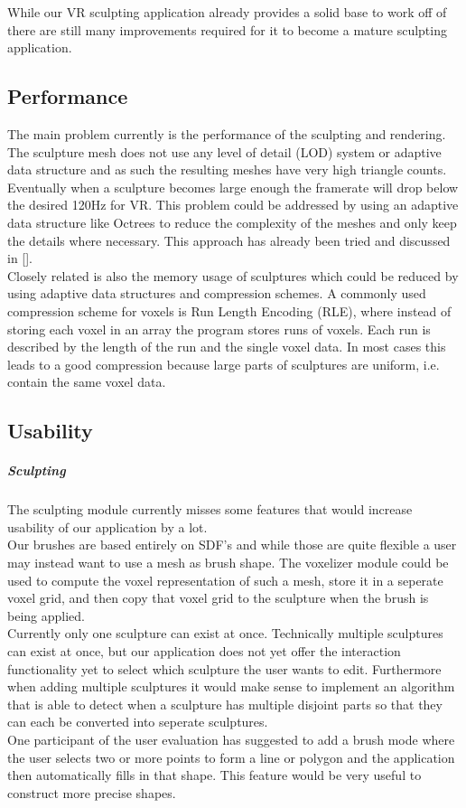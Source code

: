 While our VR sculpting application already provides a solid base to work off of there are still many improvements required for it to become a mature sculpting application.

\subsection{Performance}
The main problem currently is the performance of the sculpting and rendering. The sculpture mesh does not use any level of detail (LOD) system or adaptive data structure and as such the resulting meshes have very high triangle counts.
Eventually when a sculpture becomes large enough the framerate will drop below the desired 120Hz for VR. This problem could be addressed by using an adaptive data structure like Octrees to reduce the complexity of the meshes and only keep the details where necessary. This approach has already been tried and discussed in [].\\
Closely related is also the memory usage of sculptures which could be reduced by using adaptive data structures and compression schemes. A commonly used compression scheme for voxels is Run Length Encoding (RLE), where instead of storing
each voxel in an array the program stores runs of voxels. Each run is described by the length of the run and the single voxel data. In most cases this leads to a good compression because large parts of sculptures are uniform, i.e. contain the same voxel data.

\subsection{Usability}

\subparagraph{Sculpting}
The sculpting module currently misses some features that would increase usability of our application by a lot.\\
Our brushes are based entirely on SDF's and while those are quite flexible a user may instead want to use a mesh as brush shape. The voxelizer module could be used to compute the voxel representation of such a mesh, store it in a seperate voxel grid, and then copy that voxel grid to the sculpture when the brush is being applied.\\
Currently only one sculpture can exist at once. Technically multiple sculptures can exist at once, but our application does not yet offer the interaction functionality yet to select which sculpture the user wants to edit. Furthermore when adding multiple sculptures it would make sense to implement an algorithm that is able to detect when a sculpture has multiple disjoint parts so that they can each be converted into seperate sculptures.\\
One participant of the user evaluation has suggested to add a brush mode where the user selects two or more points to form a line or polygon and the application then automatically fills in that shape. This feature would be very useful to construct more precise shapes.

